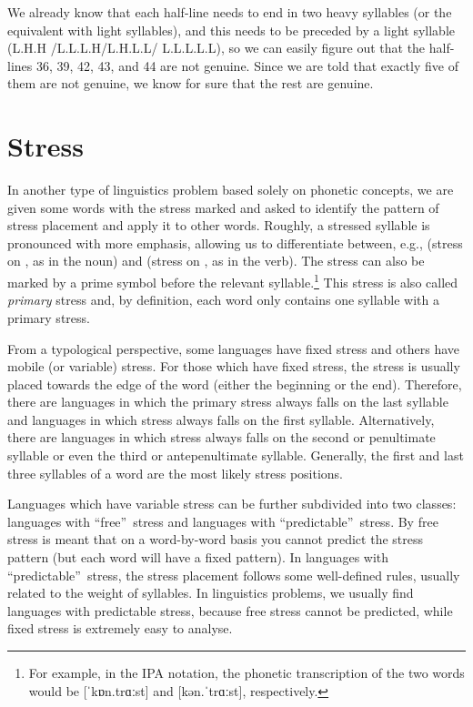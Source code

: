 \begin{refsection}
\begin{mysolution}
We already know that each half-line needs to end in two heavy syllables (or the equivalent with light syllables), and this needs to be preceded by a light syllable (L.H.H /L.L.L.H/L.H.L.L/ L.L.L.L.L), so we can easily figure out that the half-lines 36, 39, 42, 43, and 44 are not genuine. Since we are told that exactly five of them are not genuine, we know for sure that the rest are genuine.
\end{mysolution}

\section{Stress}

In another type of linguistics problem based solely on phonetic concepts, we are given some words with the stress marked and asked to identify the pattern of stress placement and apply it to other words. Roughly, a stressed syllable is pronounced with more emphasis, allowing us to differentiate between, e.g.,  (stress on , as in the noun) and  (stress on , as in the verb). The stress can also be marked by a prime symbol before the relevant syllable.\footnote{For example, in the IPA notation, the phonetic transcription of the two words would be [{ˈkɒn.trɑːst}] and [{kən.ˈtrɑːst}], respectively.} This stress is also called \textit{primary} stress and, by definition, each word only contains one syllable with a primary stress.

From a typological perspective, some languages have fixed stress and others have mobile (or variable) stress. For those which have fixed stress, the stress is usually placed towards the edge of the word (either the beginning or the end). Therefore, there are languages in which the primary stress always falls on the last syllable and languages in which stress always falls on the first syllable. Alternatively, there are languages in which stress always falls on the second or penultimate syllable or even the third or antepenultimate syllable. Generally, the first and last three syllables of a word are the most likely stress positions.

\begin{sloppypar}
Languages which have variable stress can be further subdivided into two classes: languages with “free”\ stress and languages with “predictable”\ stress. By free stress is meant that on a word-by-word basis you cannot predict the stress pattern (but each word will have a fixed pattern). In languages with “predictable”\ stress, the stress placement follows some well-defined rules, usually related to the weight of syllables. In linguistics problems, we usually find languages with predictable stress, because free stress cannot be predicted, while fixed stress is extremely easy to analyse.
\end{sloppypar}


\end{refsection}
